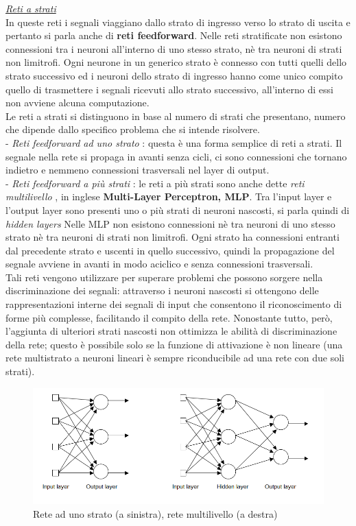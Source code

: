 \documentclass[12pt,a4paper,oneside]{book}
\begin{document}
		
		\underline{\emph{Reti a strati}}\\
		In queste reti i segnali viaggiano dallo strato di ingresso verso lo strato di uscita e pertanto si parla anche di \textbf{reti feedforward}. Nelle reti stratificate non esistono connessioni tra i neuroni all'interno di uno stesso strato, nè tra neuroni di strati non limitrofi. Ogni neurone in un generico strato è connesso con tutti quelli dello strato successivo ed i neuroni dello strato di ingresso hanno come unico compito quello di trasmettere i segnali ricevuti allo strato successivo, all'interno di essi non avviene alcuna computazione.\\
		Le reti a strati si distinguono in base al numero di strati che presentano, numero che dipende dallo specifico problema che si intende risolvere.\\ 
		- \emph{Reti feedforward ad uno strato} : questa è una forma semplice di reti a strati. Il segnale nella rete si propaga in avanti senza cicli, ci sono connessioni che tornano indietro e nemmeno connessioni trasversali nel layer di output.\\
		- \emph{Reti feedforward a più strati }: le reti a più strati sono anche dette \textit{reti multilivello }, in inglese \textbf{\textit{}Multi-Layer Perceptron, MLP}. Tra l'input layer e l'output layer sono presenti uno o più strati di neuroni nascosti, si parla quindi di \textit{\textit{hidden layers}} Nelle MLP non esistono connessioni nè tra neuroni di uno stesso strato nè tra neuroni di strati non limitrofi. Ogni strato ha connessioni entranti dal precedente strato e uscenti in quello successivo, quindi la propagazione del segnale avviene in avanti in modo aciclico e senza connessioni trasversali.\\
		Tali reti vengono utilizzare per superare problemi che possono sorgere nella discriminazione dei segnali: attraverso i neuroni nascosti si ottengono delle rappresentazioni interne dei segnali di input che consentono il riconoscimento di forme più complesse, facilitando il compito della rete. 
		Nonostante tutto, però, l’aggiunta di ulteriori strati nascosti non ottimizza le abilità di discriminazione della rete; questo è possibile solo se la funzione di attivazione è non lineare (una rete multistrato a neuroni lineari è sempre riconducibile ad una rete con due soli strati).\\ 
		
		\begin{figure}[h]
			\centering
			\includegraphics[width=1\linewidth]{IMMAGINI/unostrato}
			\caption{Rete ad uno strato (a sinistra), rete multilivello (a destra)}
			\label{fig:multistrato}
		\end{figure}
		
\end{document}
